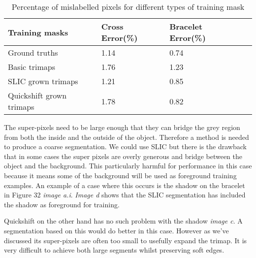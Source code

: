 \documentclass[12pt]{IIBproject}
\begin{document}
  
\begin{table}
\begin{center}
    \begin{tabular}{ | l | l | l | p{5cm} |}
    \hline
    Training masks & Cross Error(\%) & Bracelet Error(\%) \\ \hline
    Ground truths & 1.14 & 0.74 \\ \hline
    Basic trimaps & 1.76 & 1.23 \\
    \hline
    SLIC grown trimaps & 1.21 & 0.85 \\
    \hline
    Quickshift grown trimaps & 1.78 & 0.82 \\
    \hline
    \end{tabular}
    \caption{Percentage of mislabelled pixels for different types of training mask}\label{table:somename}
\end{center}
\end{table}
The super-pixels need to be large enough that they can bridge the grey region from both the inside and the outside of the object. Therefore a method is needed to produce a coarse segmentation. We could use SLIC but there is the drawback that in some cases the super pixels are overly generous and bridge between the object and the background. This particularly harmful for performance in this case because it means some of the background will be used as foreground training examples. An example of a case where this occurs is the shadow on the bracelet in Figure 32 \emph{image a.i}. \emph{Image d} shows that the SLIC segmentation has included the shadow as foreground for training.

Quickshift on the other hand has no such problem with the shadow \emph{image c}. A segmentation based on this would do better in this case. However as we've discussed its super-pixels are often too small to usefully expand the trimap. It is very difficult to achieve both large segments whilst preserving soft edges. 
\end{document}
